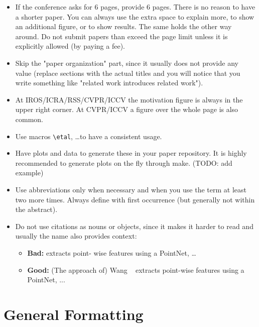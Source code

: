 \documentclass[a4paper, 10 pt, conference]{ieeeconf} %
\begin{document}
\begin{itemize}
  \item If the conference asks for 6 pages, provide 6 pages. There is no reason to have a shorter paper. You can always use the extra space to explain more, to show an additional figure, or to show results. The same holds the other way around. Do not submit papers than exceed the page limit unless it is explicitly allowed (by paying a fee).
  \item Skip the "paper organization" part, since it usually does not provide any value (replace sections with the actual titles and you will notice that you write something like "related work introduces related work").
  \item At IROS/ICRA/RSS/CVPR/ICCV the motivation figure is always in the upper right corner. At CVPR/ICCV a figure over the whole page is also common.
  \item Use macros \verb_\etal_, \dots to have a consistent usage.
  \item Have plots and data to generate these in your paper repository. It is highly recommended to generate plots on the fly through make. (TODO: add example)
  \item Use abbreviations only when necessary and when you use the term at least two more times. Always define with first occurrence (but generally not within the abstract).
  \item Do not use citations as nouns or objects, since it makes it harder to read and usually the name also provides context:
  \begin{itemize}
    \item \textbf{Bad:} \cite{stachniss2004iros} extracts point-
    wise features using a PointNet, \dots
    \item \textbf{Good:} (The approach of) Wang \etal~\cite{stachniss2004iros} extracts point-wise features using a PointNet, ...
  \end{itemize}
\end{itemize}


\section{General Formatting}
\end{document}
